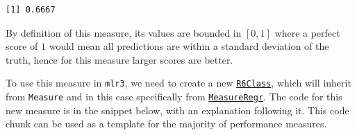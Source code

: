 \begin{verbatim}
[1] 0.6667
\end{verbatim}

By definition of this measure, its values are bounded in \([0, 1]\)
where a perfect score of \(1\) would mean all predictions are within a
standard deviation of the truth, hence for this measure larger scores
are better.

To use this measure in \texttt{mlr3}, we need to create a new
\href{https://www.rdocumentation.org/packages/R6/topics/R6Class}{\texttt{R6Class}},
which will inherit from \texttt{Measure} and in this case specifically
from
\href{https://mlr3.mlr-org.com/reference/MeasureRegr.html}{\texttt{MeasureRegr}}.
The code for this new measure is in the snippet below, with an
explanation following it. This code chunk can be used as a template for
the majority of performance measures.

